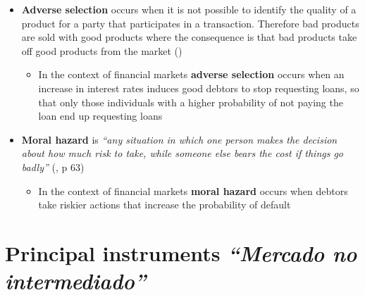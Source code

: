 \documentclass[
  ignorenonframetext,
]{beamer}
\providecommand{\tightlist}{%
  \setlength{\itemsep}{0pt}\setlength{\parskip}{0pt}}\usepackage{longtable,booktabs,array}
\begin{document}
\begin{frame}{}
\label{section-9}
\begin{itemize}
\item
  \textbf{Adverse selection} occurs when it is not possible to identify
  the quality of a product for a party that participates in a
  transaction. Therefore bad products are sold with good products where
  the consequence is that bad products take off good products from the
  market ()

  \begin{itemize}
  \tightlist
  \item
    In the context of financial markets \textbf{adverse selection}
    occurs when an increase in interest rates induces good debtors to
    stop requesting loans, so that only those individuals with a higher
    probability of not paying the loan end up requesting loans
  \end{itemize}
\end{itemize}
\end{frame}

\begin{frame}{}
\label{section-10}
\begin{itemize}
\item
  \textbf{Moral hazard} is \emph{``any situation in which one person
  makes the decision about how much risk to take, while someone else
  bears the cost if things go badly''}
  (, p 63)

  \begin{itemize}
  \tightlist
  \item
    In the context of financial markets \textbf{moral hazard} occurs
    when debtors take riskier actions that increase the probability of
    default
  \end{itemize}
\end{itemize}
\end{frame}

\section{\texorpdfstring{Principal instruments \emph{``Mercado no
intermediado''}}{Principal instruments ``Mercado no intermediado''}}\label{principal-instruments-mercado-no-intermediado}
\end{document}
